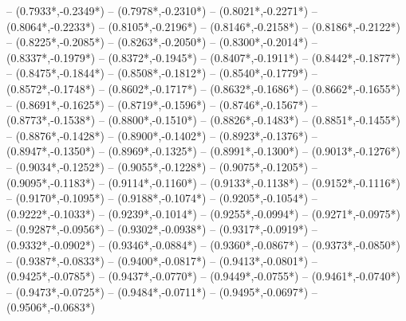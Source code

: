{	-- ({0.7933*\dx},{-0.2349*\dy})
	-- ({0.7978*\dx},{-0.2310*\dy})
	-- ({0.8021*\dx},{-0.2271*\dy})
	-- ({0.8064*\dx},{-0.2233*\dy})
	-- ({0.8105*\dx},{-0.2196*\dy})
	-- ({0.8146*\dx},{-0.2158*\dy})
	-- ({0.8186*\dx},{-0.2122*\dy})
	-- ({0.8225*\dx},{-0.2085*\dy})
	-- ({0.8263*\dx},{-0.2050*\dy})
	-- ({0.8300*\dx},{-0.2014*\dy})
	-- ({0.8337*\dx},{-0.1979*\dy})
	-- ({0.8372*\dx},{-0.1945*\dy})
	-- ({0.8407*\dx},{-0.1911*\dy})
	-- ({0.8442*\dx},{-0.1877*\dy})
	-- ({0.8475*\dx},{-0.1844*\dy})
	-- ({0.8508*\dx},{-0.1812*\dy})
	-- ({0.8540*\dx},{-0.1779*\dy})
	-- ({0.8572*\dx},{-0.1748*\dy})
	-- ({0.8602*\dx},{-0.1717*\dy})
	-- ({0.8632*\dx},{-0.1686*\dy})
	-- ({0.8662*\dx},{-0.1655*\dy})
	-- ({0.8691*\dx},{-0.1625*\dy})
	-- ({0.8719*\dx},{-0.1596*\dy})
	-- ({0.8746*\dx},{-0.1567*\dy})
	-- ({0.8773*\dx},{-0.1538*\dy})
	-- ({0.8800*\dx},{-0.1510*\dy})
	-- ({0.8826*\dx},{-0.1483*\dy})
	-- ({0.8851*\dx},{-0.1455*\dy})
	-- ({0.8876*\dx},{-0.1428*\dy})
	-- ({0.8900*\dx},{-0.1402*\dy})
	-- ({0.8923*\dx},{-0.1376*\dy})
	-- ({0.8947*\dx},{-0.1350*\dy})
	-- ({0.8969*\dx},{-0.1325*\dy})
	-- ({0.8991*\dx},{-0.1300*\dy})
	-- ({0.9013*\dx},{-0.1276*\dy})
	-- ({0.9034*\dx},{-0.1252*\dy})
	-- ({0.9055*\dx},{-0.1228*\dy})
	-- ({0.9075*\dx},{-0.1205*\dy})
	-- ({0.9095*\dx},{-0.1183*\dy})
	-- ({0.9114*\dx},{-0.1160*\dy})
	-- ({0.9133*\dx},{-0.1138*\dy})
	-- ({0.9152*\dx},{-0.1116*\dy})
	-- ({0.9170*\dx},{-0.1095*\dy})
	-- ({0.9188*\dx},{-0.1074*\dy})
	-- ({0.9205*\dx},{-0.1054*\dy})
	-- ({0.9222*\dx},{-0.1033*\dy})
	-- ({0.9239*\dx},{-0.1014*\dy})
	-- ({0.9255*\dx},{-0.0994*\dy})
	-- ({0.9271*\dx},{-0.0975*\dy})
	-- ({0.9287*\dx},{-0.0956*\dy})
	-- ({0.9302*\dx},{-0.0938*\dy})
	-- ({0.9317*\dx},{-0.0919*\dy})
	-- ({0.9332*\dx},{-0.0902*\dy})
	-- ({0.9346*\dx},{-0.0884*\dy})
	-- ({0.9360*\dx},{-0.0867*\dy})
	-- ({0.9373*\dx},{-0.0850*\dy})
	-- ({0.9387*\dx},{-0.0833*\dy})
	-- ({0.9400*\dx},{-0.0817*\dy})
	-- ({0.9413*\dx},{-0.0801*\dy})
	-- ({0.9425*\dx},{-0.0785*\dy})
	-- ({0.9437*\dx},{-0.0770*\dy})
	-- ({0.9449*\dx},{-0.0755*\dy})
	-- ({0.9461*\dx},{-0.0740*\dy})
	-- ({0.9473*\dx},{-0.0725*\dy})
	-- ({0.9484*\dx},{-0.0711*\dy})
	-- ({0.9495*\dx},{-0.0697*\dy})
	-- ({0.9506*\dx},{-0.0683*\dy})
}
